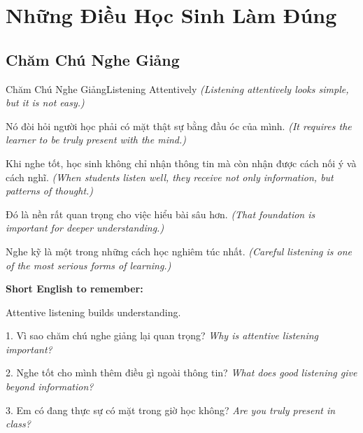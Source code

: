 \chapter{Những Điều Học Sinh Làm Đúng}

\section{Chăm Chú Nghe Giảng}
\begin{truyen}{Chăm Chú Nghe Giảng}{Listening Attentively}
\textit{(Listening attentively looks simple, but it is not easy.)}

Nó đòi hỏi người học phải có mặt thật sự bằng đầu óc của mình.
\textit{(It requires the learner to be truly present with the mind.)}

Khi nghe tốt, học sinh không chỉ nhận thông tin mà còn nhận được cách nối ý và cách nghĩ.
\textit{(When students listen well, they receive not only information, but patterns of thought.)}

Đó là nền rất quan trọng cho việc hiểu bài sâu hơn.
\textit{(That foundation is important for deeper understanding.)}
\end{truyen}

\begin{baihoc}
Nghe kỹ là một trong những cách học nghiêm túc nhất.
\textit{(Careful listening is one of the most serious forms of learning.)}
\end{baihoc}

\begin{ghinhoanh}
\textbf{Short English to remember:}

Attentive listening builds understanding.

\end{ghinhoanh}

\begin{tuhocnhanh}
1. Vì sao chăm chú nghe giảng lại quan trọng? \textit{Why is attentive listening important?}

2. Nghe tốt cho mình thêm điều gì ngoài thông tin? \textit{What does good listening give beyond information?}

3. Em có đang thực sự có mặt trong giờ học không? \textit{Are you truly present in class?}
\end{tuhocnhanh}
\ngancach

